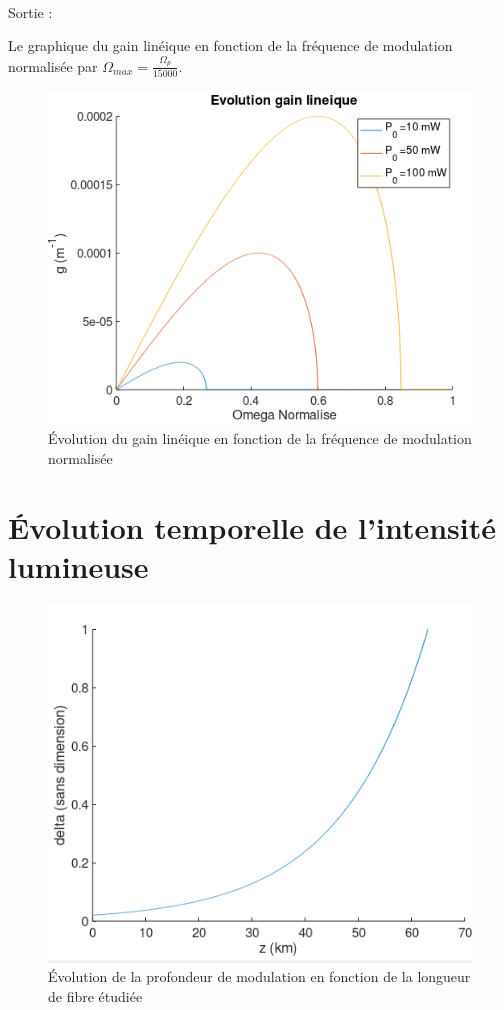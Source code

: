 \documentclass[a4paper,12pt,titlepage]{article}
\begin{document}
             ~
             
             Sortie :
             
            Le graphique du gain linéique en fonction de la fréquence de modulation normalisée par $\Omega_{max} = \frac{\Omega_p}{15000}$.
            
            \begin{figure}[h!]
                \centering
                \includegraphics{g(omega)}
                \caption{Évolution du gain linéique en fonction de la fréquence de modulation normalisée}
                \label{delta}
            \end{figure}
    
    
    \newpage
    
    \section{Évolution temporelle de l'intensité lumineuse}
    
        \begin{figure}[h!]
            \centering
            \includegraphics{delta(z)}
            \caption{Évolution de la profondeur de modulation en fonction de la longueur de fibre étudiée}
            \label{delta}
        \end{figure}
    
\end{document}
